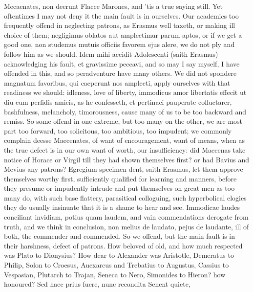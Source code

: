 {Mecaenates, non deerunt Flacce Marones, and 'tis a true saying still.
Yet oftentimes I may not deny it the main fault is in ourselves. Our
academics too frequently offend in neglecting patrons, as Erasmus
well taxeth, or making ill choice of them; negligimus oblatos aut
amplectimur parum aptos, or if we get a good one, non studemus mutuis
officiis favorem ejus alere, we do not ply and follow him as we should.
Idem mihi accidit Adolescenti (saith Erasmus) acknowledging his fault,
et gravissime peccavi, and so may I say myself, I have offended
in this, and so peradventure have many others. We did not spondere
magnatum favoribus, qui caeperunt nos amplecti, apply ourselves with
that readiness we should: idleness, love of liberty, immodicus amor
libertatis effecit ut diu cum perfidis amicis, as he confesseth, et
pertinaci pauperate colluctarer, bashfulness, melancholy, timorousness,
cause many of us to be too backward and remiss. So some offend in one
extreme, but too many on the other, we are most part too forward, too
solicitous, too ambitious, too impudent; we commonly complain deesse
Maecenates, of want of encouragement, want of means, when as the true
defect is in our own want of worth, our insufficiency: did Maecenas
take notice of Horace or Virgil till they had shown themselves first?
or had Bavius and Mevius any patrons? Egregium specimen dent, saith
Erasmus, let them approve themselves worthy first, sufficiently
qualified for learning and manners, before they presume or impudently
intrude and put themselves on great men as too many do, with such base
flattery, parasitical colloguing, such hyperbolical elogies they do
usually insinuate that it is a shame to hear and see. Immodicae laudes
conciliant invidiam, potius quam laudem, and vain commendations
derogate from truth, and we think in conclusion, non melius de laudato,
pejus de laudante, ill of both, the commender and commended. So we
offend, but the main fault is in their harshness, defect of patrons.
How beloved of old, and how much respected was Plato to Dionysius? How
dear to Alexander was Aristotle, Demeratus to Philip, Solon to Croesus,
Auexarcus and Trebatius to Augustus, Cassius to Vespasian, Plutarch to
Trajan, Seneca to Nero, Simonides to Hieron? how honoured?
Sed haec prius fuere, nunc recondita
Senent quiete,

}
